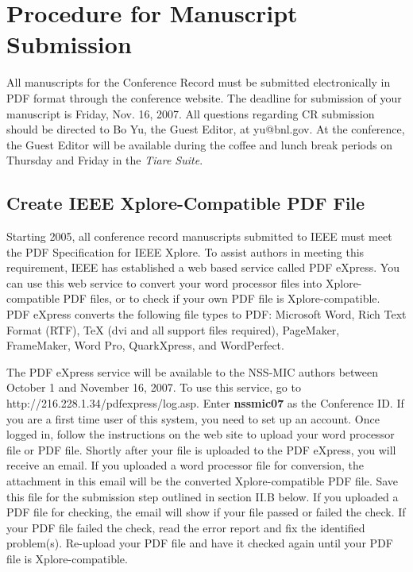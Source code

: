 \documentclass[journal]{IEEEtran}
\begin{document}
\section{Procedure for Manuscript Submission}

All manuscripts for the Conference Record must be submitted electronically in PDF format through the conference website. The deadline for submission of your manuscript is Friday, Nov. 16, 2007. All questions regarding CR submission should be directed to Bo Yu, the Guest Editor, at yu@bnl.gov. At the conference, the Guest Editor will be available during the coffee and lunch break periods on Thursday and Friday in the {\it Tiare Suite}.

\subsection{Create IEEE Xplore-Compatible PDF File}

Starting 2005, all conference record manuscripts submitted to IEEE must meet the PDF Specification for IEEE Xplore\cite{IEEEPDFRequirement401}. To assist authors in meeting this requirement, IEEE has established a web based service called PDF eXpress. You can use this web service to convert your word processor files into Xplore-compatible PDF files, or to check if your own PDF file is Xplore-compatible. PDF eXpress converts the following file types to PDF: Microsoft Word, Rich Text Format (RTF), {\TeX} (dvi and all support files required), PageMaker, FrameMaker, Word Pro, QuarkXpress,  and WordPerfect.

The PDF eXpress service will be available to the NSS-MIC authors between October 1 and November 16, 2007.  To use this service, go to http://216.228.1.34/pdfexpress/log.asp.  Enter {\bf nssmic07} as the Conference ID.  If you are a first time user of this system, you need to set up an account.  Once logged in, follow the instructions on the web site to upload your word processor file or PDF file.  Shortly after your file is uploaded to the PDF eXpress, you will receive an email. If you uploaded a word processor file for conversion, the attachment in this email will be the converted Xplore-compatible PDF file.  Save this file for the submission step outlined in section II.B below.  If you uploaded a PDF file for checking, the email will show if your file passed or failed the check.  If your PDF file failed the check, read the error report and fix the identified problem(s).  Re-upload your PDF file and have it checked again until your PDF file is Xplore-compatible.
\end{document}
